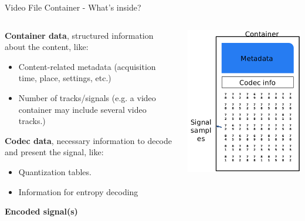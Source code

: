 \begin{tframe}{Video File Container - What's inside?}

\vspace{0.2cm}

\begin{minipage}{\textwidth}
\begin{columns}[T]

\begin{column}{0.55\textwidth}
\textbf{Container data}, structured information about the content, like:
\begin{itemize}
\item Content-related metadata (acquisition time, place, settings, etc.)
\item Number of tracks/signals (e.g. a video container may include several video tracks.)
\end{itemize}

\textbf{Codec data}, necessary information to decode and present the signal, like:
\begin{itemize}
\item Quantization tables.
\item Information for entropy decoding
\end{itemize}

\textbf{Encoded signal(s)}
\end{column}

\begin{column}{0.45\textwidth}
\includegraphics[width=1\textwidth]{images/container.png}
\end{column}


\end{columns}
\end{minipage}
\end{tframe}
